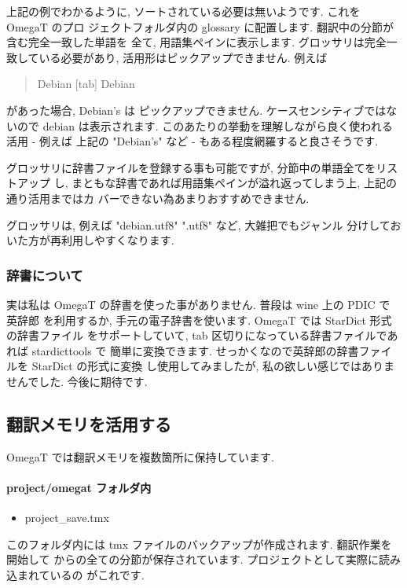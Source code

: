 \documentclass[mingoth,a4paper]{jsarticle}
\begin{document}
上記の例でわかるように, ソートされている必要は無いようです. これを OmegaT のプロ
ジェクトフォルダ内の glossary に配置します. 翻訳中の分節が含む完全一致した単語を
全て, 用語集ペインに表示します.
グロッサリは完全一致している必要があり, 活用形はピックアップできません.
例えば
\begin{quote}
Debian [tab] Debian
\end{quote}
があった場合, Debian's は ピックアップできません. ケースセンシティブではないので
debian は表示されます. このあたりの挙動を理解しながら良く使われる活用 - 例えば
上記の "Debian's" など - もある程度網羅すると良さそうです.

グロッサリに辞書ファイルを登録する事も可能ですが, 分節中の単語全てをリストアップ
し, まともな辞書であれば用語集ペインが溢れ返ってしまう上, 上記の通り活用まではカ
バーできない為あまりおすすめできません.

グロッサリは, 例えば "debian.utf8" ".utf8" など, 大雑把でもジャンル
分けしておいた方が再利用しやすくなります.


\subsubsection{辞書について}
実は私は OmegaT の辞書を使った事がありません. 普段は wine 上の PDIC で 英辞郎
を利用するか, 手元の電子辞書を使います. OmegaT では StarDict 形式の辞書ファイル
をサポートしていて, tab 区切りになっている辞書ファイルであれば stardicttools で
簡単に変換できます. せっかくなので英辞郎の辞書ファイルを StarDict の形式に変換
し使用してみましたが, 私の欲しい感じではありませんでした. 今後に期待です.

\subsection{翻訳メモリを活用する}
OmegaT では翻訳メモリを複数箇所に保持しています.

\paragraph{project/omegat フォルダ内}
\begin{itemize}
	\item{project\_save.tmx}
\end{itemize}
このフォルダ内には tmx ファイルのバックアップが作成されます. 翻訳作業を開始して
からの全ての分節が保存されています. プロジェクトとして実際に読み込まれているの
がこれです.
\end{document}
